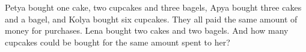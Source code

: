 Petya bought one cake, two cupcakes and three bagels, Apya bought three cakes and a bagel, and Kolya bought six cupcakes. They all paid the same amount of money for purchases. Lena bought two cakes and two bagels. And how many cupcakes could be bought for the same amount spent to her?